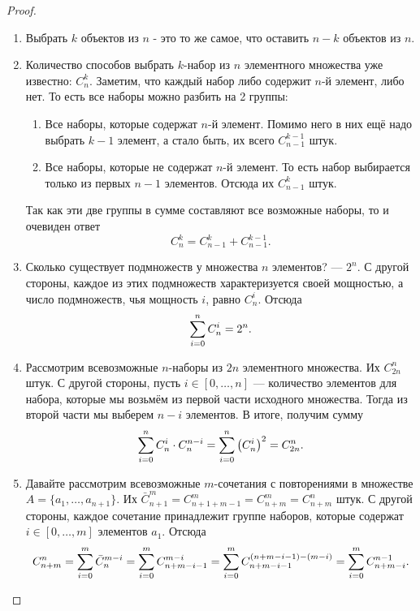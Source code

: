 \begin{proof}~
	\begin{enumerate}
		\item Выбрать $k$ объектов из $n$ - это то же самое, что оставить $n - k$ объектов из $n$.
		
		\item Количество способов выбрать $k$-набор из $n$ элементного множества уже известно: $C_n^k$. Заметим, что каждый набор либо содержит $n$-й элемент, либо нет. То есть все наборы можно разбить на 2 группы:
		\begin{enumerate}
			\item Все наборы, которые содержат $n$-й элемент. Помимо него в них ещё надо выбрать $k - 1$ элемент, а стало быть, их всего $C_{n - 1}^{k - 1}$ штук.
			
			\item Все наборы, которые не содержат $n$-й элемент. То есть набор выбирается только из первых $n - 1$ элементов. Отсюда их $C_{n - 1}^k$ штук.
		\end{enumerate}
		Так как эти две группы в сумме составляют все возможные наборы, то и очевиден ответ
		\[
			C_n^k = C_{n - 1}^k + C_{n - 1}^{k - 1}.
		\]
		
		\item Сколько существует подмножеств у множества $n$ элементов? --- $2^n$. С другой стороны, каждое из этих подмножеств характеризуется своей мощностью, а число подмножеств, чья мощность $i$, равно $C_n^i$. Отсюда
		\[
			\sum\limits_{i = 0}^n C_n^i = 2^n.
		\]
		
		\item Рассмотрим всевозможные $n$-наборы из $2n$ элементного множества. Их $C_{2n}^n$ штук. С другой стороны, пусть $i \in [0, \ldots, n]$ --- количество элементов для набора, которые мы возьмём из первой части исходного множества. Тогда из второй части мы выберем $n - i$ элементов. В итоге, получим сумму
		\[
			\sum\limits_{i = 0}^n C_n^i \cdot C_n^{n - i} = \sum\limits_{i = 0}^n \left(C_n^i\right)^2 = C_{2n}^n.
		\]
		
		\item Давайте рассмотрим всевозможные $m$-сочетания с повторениями в множестве $A = \{a_1, \ldots, a_{n + 1}\}$. Их $\bar{C}_{n + 1}^m = C_{n + 1 + m - 1}^m = C_{n + m}^m = C_{n + m}^n$ штук. С другой стороны, каждое сочетание принадлежит группе наборов, которые содержат $i \in [0, \ldots, m]$ элементов $a_1$. Отсюда
		\[
			C_{n + m}^n = \sum\limits_{i = 0}^m \bar{C}_n^{m - i} = \sum\limits_{i = 0}^m C_{n + m - i - 1}^{m - i} = \sum\limits_{i = 0}^m C_{n + m - i - 1}^{(n + m - i - 1) - (m - i)} = \sum\limits_{i = 0}^m C_{n + m - i}^{n - 1}.
		\]
	\end{enumerate}
\end{proof}